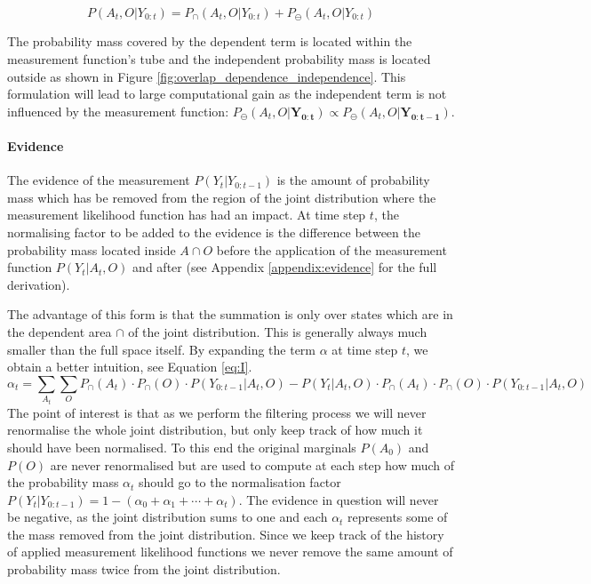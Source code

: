\begin{equation}\label{eq:joint_independent_dependent}
 P(A_t,O|Y_{0:t}) = P_{\cap}(A_t,O|Y_{0:t}) + P_{\ominus}(A_t,O|Y_{0:t})
\end{equation}

The probability mass covered by the dependent term is located within the measurement function's tube and the independent probability mass 
is located outside as shown in Figure \ref{fig:overlap_dependence_independence}. This formulation will lead to large computational gain 
as the independent term is not influenced by the measurement function: $P_{\ominus}(A_t,O|\mathbf{Y_{0:t}}) \propto P_{\ominus}(A_t,O|\mathbf{Y_{0:t-1}})$.

\paragraph{Evidence}
The evidence of the measurement $P(Y_t|Y_{0:t-1})$ is the amount of probability mass which has be removed from the region of the joint 
distribution where the measurement likelihood function has had an impact. At time step $t$, the normalising factor to be added to 
the evidence is the difference between the probability mass located inside $A\cap O$ before the application of the measurement 
function $P(Y_t|A_t,O)$ and after (see Appendix \ref{appendix:evidence} for the full derivation).

The advantage of this form is that the summation is only over states which are in the dependent area $\cap$ of the joint 
distribution. This is generally always much smaller than the full space itself. By expanding the term $\alpha$ at time step $t$, 
we obtain a better intuition, see Equation \ref{eq:I}.
\begin{equation}\label{eq:I}
 \alpha_t =  \sum\limits_{A_t}\sum\limits_{O} P_{\cap}(A_t)\cdot P_{\cap}(O) \cdot P(Y_{0:t-1}|A_t,O)  - P(Y_t|A_t,O)\cdot P_{\cap}(A_t)\cdot P_{\cap}(O) \cdot P(Y_{0:t-1}|A_t,O) 
\end{equation}
The point of interest is that as we perform the filtering process we will never renormalise the whole joint distribution, but only keep 
track of how much it should have been normalised. To this end the original marginals $P(A_0)$ and $P(O)$  are never renormalised but are used 
to compute at each step how much of the probability mass $\alpha_t$ should go to the normalisation factor 
$P(Y_t|Y_{0:t-1}) = 1 - (\alpha_{0} + \alpha_{1} + \cdots + \alpha_{t})$. The evidence in question will never be negative, as the 
joint distribution sums to one and each $\alpha_t$ represents some of the mass removed from the joint distribution. Since we 
keep track of the history of applied  measurement likelihood functions we never remove the same amount of probability mass twice
from the joint distribution.


